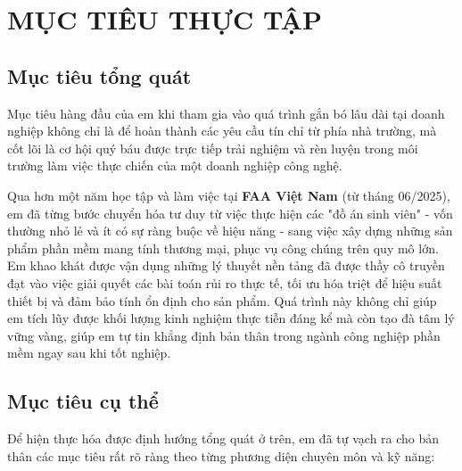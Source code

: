 \documentclass[12pt, a4paper]{article}
\begin{document}
\section{MỤC TIÊU THỰC TẬP}
\subsection{Mục tiêu tổng quát}
Mục tiêu hàng đầu của em khi tham gia vào quá trình gắn bó lâu dài tại doanh nghiệp không chỉ là để hoàn thành các yêu cầu tín chỉ từ phía nhà trường, mà cốt lõi là cơ hội quý báu được trực tiếp trải nghiệm và rèn luyện trong môi trường làm việc thực chiến của một doanh nghiệp công nghệ. 

Qua hơn một năm học tập và làm việc tại \textbf{FAA Việt Nam} (từ tháng 06/2025), em đã từng bước chuyển hóa tư duy từ việc thực hiện các "đồ án sinh viên" - vốn thường nhỏ lẻ và ít có sự ràng buộc về hiệu năng - sang việc xây dựng những sản phẩm phần mềm mang tính thương mại, phục vụ công chúng trên quy mô lớn. Em khao khát được vận dụng những lý thuyết nền tảng đã được thầy cô truyền đạt vào việc giải quyết các bài toán rủi ro thực tế, tối ưu hóa triệt để hiệu suất thiết bị và đảm bảo tính ổn định cho sản phẩm. Quá trình này không chỉ giúp em tích lũy được khối lượng kinh nghiệm thực tiễn đáng kể mà còn tạo đà tâm lý vững vàng, giúp em tự tin khẳng định bản thân trong ngành công nghiệp phần mềm ngay sau khi tốt nghiệp.

\subsection{Mục tiêu cụ thể}
Để hiện thực hóa được định hướng tổng quát ở trên, em đã tự vạch ra cho bản thân các mục tiêu rất rõ ràng theo từng phương diện chuyên môn và kỹ năng:
\end{document}
